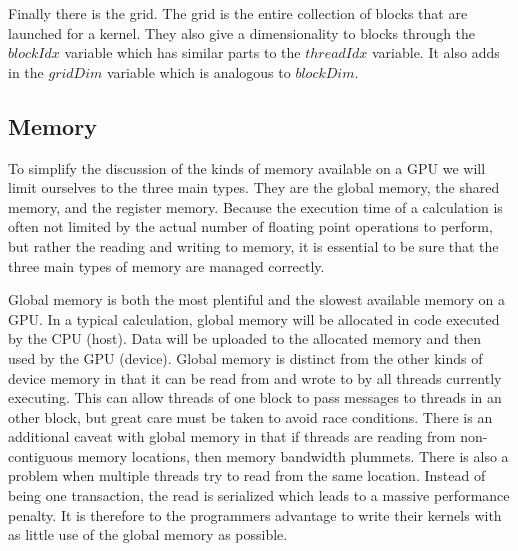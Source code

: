 \documentclass[12pt]{report}
\begin{document}
Finally there is the grid. The grid is the entire collection of blocks that are launched for a kernel. They also give a dimensionality to blocks through the $blockIdx$ variable which has similar parts to the $threadIdx$ variable. It also adds in the $gridDim$ variable which is analogous to $blockDim$.

\subsection{Memory}
\label{sec:gpumem}
To simplify the discussion of the kinds of memory available on a GPU we will limit ourselves to the three main types. They are the global memory, the shared memory, and the register memory. Because the execution time of a calculation is often not limited by the actual number of floating point operations to perform, but rather the reading and writing to memory, it is essential to be sure that the three main types of memory are managed correctly.

Global memory is both the most plentiful and the slowest available memory on a GPU. In a typical calculation, global memory will be allocated in code executed by the CPU (host). Data will be uploaded to the allocated memory and then used by the GPU (device). Global memory is distinct from the other kinds of device memory in that it can be read from and wrote to by all threads currently executing. This can allow threads of one block to pass messages to threads in an other block, but great care must be taken to avoid race conditions. There is an additional caveat with global memory in that if threads are reading from non-contiguous memory locations, then memory bandwidth plummets. There is also a problem when multiple threads try to read from the same location. Instead of being one transaction, the read is serialized which leads to a massive performance penalty. It is therefore to the programmers advantage to write their kernels with as little use of the global memory as possible.
\end{document}
